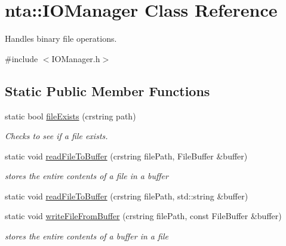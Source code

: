 \hypertarget{classnta_1_1IOManager}{}\section{nta\+:\+:I\+O\+Manager Class Reference}
\label{classnta_1_1IOManager}


Handles binary file operations.  




{\ttfamily \#include $<$I\+O\+Manager.\+h$>$}

\subsection*{Static Public Member Functions}
\begin{DoxyCompactItemize}
\item 
\mbox{\label{classnta_1_1IOManager_ad2f0b2b852d8b164ab599b09ed671805}} 
static bool \hyperlink{classnta_1_1IOManager_ad2f0b2b852d8b164ab599b09ed671805}{file\+Exists} (crstring path)
\begin{DoxyCompactList}\small\item\em Checks to see if a file exists. \end{DoxyCompactList}\item 
\mbox{\label{classnta_1_1IOManager_a8225f73838465f27e6fa60b689496d10}} 
static void \hyperlink{classnta_1_1IOManager_a8225f73838465f27e6fa60b689496d10}{read\+File\+To\+Buffer} (crstring file\+Path, File\+Buffer \&buffer)
\begin{DoxyCompactList}\small\item\em stores the entire contents of a file in a buffer \end{DoxyCompactList}\item 
static void \hyperlink{classnta_1_1IOManager_abbfd9da05b22aa488043a19344d38e0a}{read\+File\+To\+Buffer} (crstring file\+Path, std\+::string \&buffer)
\item 
\mbox{\label{classnta_1_1IOManager_a8e22ef5a2e46a48abdefa21847cf9eff}} 
static void \hyperlink{classnta_1_1IOManager_a8e22ef5a2e46a48abdefa21847cf9eff}{write\+File\+From\+Buffer} (crstring file\+Path, const File\+Buffer \&buffer)
\begin{DoxyCompactList}\small\item\em stores the entire contents of a buffer in a file \end{DoxyCompactList}\item 

\end{DoxyCompactItemize}
